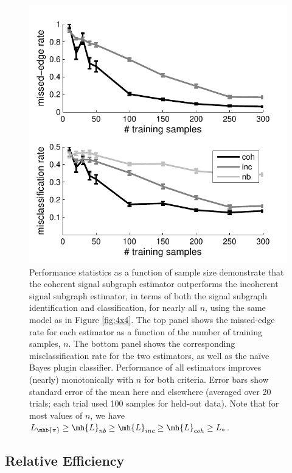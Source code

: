 \documentclass[10pt,journal,cspaper,compsoc]{IEEEtran}
\begin{document}
\begin{figure}[htbp]
	\centering
		\includegraphics[width=1.0\linewidth]{../figs/homo_V70_s20_p10_q30_Lhats.pdf}
	\caption{Performance statistics as a function of sample size demonstrate that the coherent signal subgraph estimator outperforms the incoherent signal subgraph estimator, in terms of both the signal subgraph identification and classification, for nearly all $n$, using the same model as in Figure \ref{fig:4x4}.  The top panel shows the missed-edge rate for each estimator as a function of the number of training samples, $n$.  The bottom panel shows the corresponding misclassification rate for the two estimators, as well as the na\"ive Bayes plugin classifier.  Performance of all estimators improves (nearly) monotonically with $n$ for both criteria.  Error bars show standard error of the mean here and elsewhere (averaged over 20 trials; each trial used 100 samples for held-out data). Note that for most values of $n$, we have $L_{\mhb{\pi}} \geq \mh{L}_{nb} \geq \mh{L}_{inc} \geq \mh{L}_{coh} \geq L_*$.}
	\label{fig:homo}
\end{figure}


\subsection{Relative Efficiency} %
\label{sub:relative_efficiencies}
\end{document}
